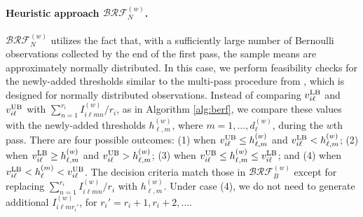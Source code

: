 \documentclass[11pt]{article}
\begin{document}
\paragraph{Heuristic approach $\mathcal{BRF}_N^{(w)}$.}
$\mathcal{BRF}_N^{(w)}$ utilizes the fact that, with a sufficiently large number of Bernoulli observations collected by the end of the first pass, the sample means are approximately normally distributed. In this case, we perform feasibility checks for the newly-added thresholds similar to the multi-pass procedure from \citet{Zhou2024}, which is designed for normally distributed observations. Instead of comparing $v_{i\ell}^{\rm LB}$ and $v_{i\ell}^{\rm UB}$ with $\sum_{n=1}^{r_i} I_{i\ell mn}^{(w)}/r_i$, as in Algorithm \ref{alg:berf}, we compare these values with the newly-added thresholds $h_{\ell, m}^{(w)}$, where $m=1,\ldots,d_\ell^{(w)}$, during the $w$th pass. There are four possible outcomes: (1) when $v_{i\ell}^{\rm UB}\leq h_{\ell,m}^{(w)}$ and $v_{i\ell}^{\rm LB}<h_{\ell,m}^{(w)}$; (2) when $v_{i\ell}^{\rm LB} \geq h_{\ell,m}^{(w)}$ and $v_{i\ell}^{\rm UB}>h_{\ell,m}^{(w)}$; (3) when $v_{i\ell}^{\rm UB}\leq h_{\ell,m}^{(w)}\leq v_{i\ell}^{\rm LB}$; and (4) when $v_{i\ell}^{\rm LB}< h_\ell^{(m)} < v_{i\ell}^{\rm UB}$. The decision criteria match those in $\mathcal{BRF}_B^{(w)}$  except for replacing $\sum_{n=1}^{r_i} I_{i\ell mn}^{(w)}/r_i$ with $h_{\ell, m}^{(w)}$. Under case (4), we do not need to generate additional $I_{i\ell m r_i'}^{(w)}$, for $r_i'=r_i+1,r_i+2,\ldots$. 
\end{document}

